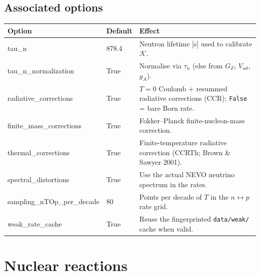 \documentclass[11pt,a4paper]{article}
\newcommand{\code}[1]{\texttt{#1}}
\newcommand{\Kw}{\mathcal{K}}
\begin{document}
\subsection{Associated options}
\begin{center}\small
\begin{tabular}{>{\ttfamily}l l >{\raggedright\arraybackslash}p{8.4cm}}
\toprule
\normalfont Option & Default & Effect \\
\midrule
tau\_n                  & 878.4 & Neutron lifetime [s] used to calibrate $\Kw$. \\
tau\_n\_normalization   & True  & Normalise via $\tau_n$ (else from $G_F$, $V_{ud}$, $g_A$). \\
radiative\_corrections  & True  & $T=0$ Coulomb + resummed radiative corrections (CCR); \code{False} = bare Born rate. \\
finite\_mass\_corrections & True & Fokker--Planck finite-nucleon-mass correction. \\
thermal\_corrections    & True  & Finite-temperature radiative correction (CCRTh; Brown \& Sawyer 2001). \\
spectral\_distortions   & True  & Use the actual NEVO neutrino spectrum in the rates. \\
sampling\_nTOp\_per\_decade & 80 & Points per decade of $T$ in the $n\leftrightarrow p$ rate grid. \\
weak\_rate\_cache       & True  & Reuse the fingerprinted \code{data/weak/} cache when valid. \\
\bottomrule
\end{tabular}
\end{center}

\section{Nuclear reactions}\label{sec:nuclear}
\end{document}
